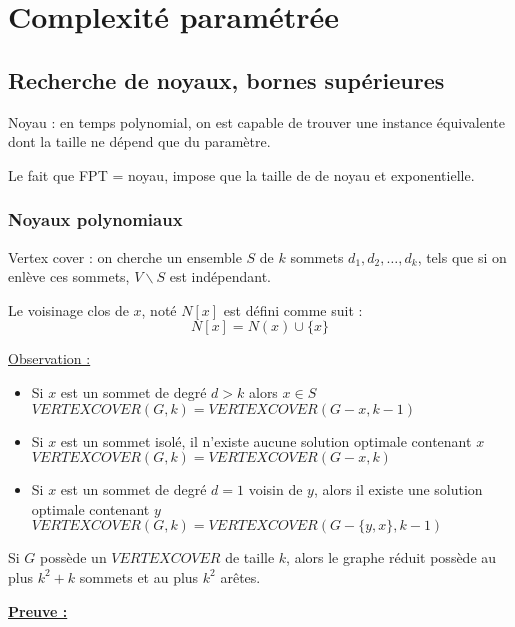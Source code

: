 \documentclass[a4paper, 11pt]{report}
\begin{document}
\section{Complexité paramétrée}
\subsection{Recherche de noyaux, bornes supérieures}

Noyau : en temps polynomial, on est capable de trouver une instance équivalente dont la taille ne
dépend que du paramètre.

Le fait que FPT = noyau, impose que la taille de de noyau et exponentielle.


\subsubsection{Noyaux polynomiaux}

Vertex cover : on cherche un ensemble $S$ de $k$ sommets $d_1, d_2, \dots, d_k$, tels que si on enlève
ces sommets, $V \backslash S$ est indépendant.

\begin{df}
    Le voisinage clos de $x$, noté $N[x]$ est défini comme suit : $$
    N[x] = N(x) \cup \{x\} $$
\end{df}

\underline{Observation :}
\begin{itemize}
    \item Si $x$ est un sommet de degré $d > k$ alors $x \in S$
        $VERTEX COVER(G, k) = VERTEX COVER(G - x, k - 1)$
    \item Si $x$ est un sommet isolé, il n'existe aucune solution optimale contenant $x$
        $VERTEX COVER(G, k) = VERTEX COVER (G-x, k)$
    \item Si $x$ est un sommet de degré $d = 1$ voisin de $y$, alors il existe une solution optimale
        contenant $y$
        $VERTEX COVER(G, k) = VERTEX COVER(G - \{y, x\}, k - 1)$
\end{itemize}

\begin{lemma}
    Si $G$ possède un $VERTEX COVER$ de taille $k$, alors le graphe réduit possède au plus $k^2 + k$
    sommets et au plus $k^2$ arêtes.
\end{lemma}

\textbf{\underline{Preuve :}}
\end{document}

